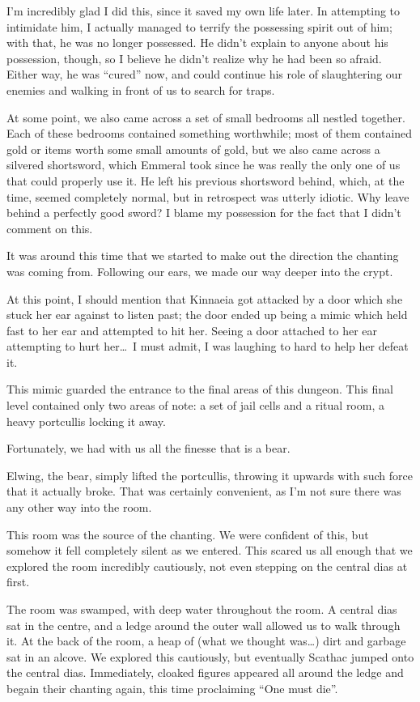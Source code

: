 I'm incredibly glad I did this, since it saved my own life later. In attempting to intimidate him, I actually managed to terrify the possessing spirit out of him; with that, he was no longer possessed. He didn't explain to anyone about his possession, though, so I believe he didn't realize why he had been so afraid. Either way, he was ``cured'' now, and could continue his role of slaughtering our enemies and walking in front of us to search for traps.

At some point, we also came across a set of small bedrooms all nestled together. Each of these bedrooms contained something worthwhile; most of them contained gold or items worth some small amounts of gold, but we also came across a silvered shortsword, which Emmeral took since he was really the only one of us that could properly use it. He left his previous shortsword behind, which, at the time, seemed completely normal, but in retrospect was utterly idiotic. Why leave behind a perfectly good sword? I blame my possession for the fact that I didn't comment on this.

It was around this time that we started to make out the direction the chanting was coming from. Following our ears, we made our way deeper into the crypt.

At this point, I should mention that Kinnaeia got attacked by a door which she stuck her ear against to listen past; the door ended up being a mimic which held fast to her ear and attempted to hit her. Seeing a door attached to her ear attempting to hurt her\dots\ I must admit, I was laughing to hard to help her defeat it.

This mimic guarded the entrance to the final areas of this dungeon. This final level contained only two areas of note: a set of jail cells and a ritual room, a heavy portcullis locking it away.

Fortunately, we had with us all the finesse that is a bear.

Elwing, the bear, simply lifted the portcullis, throwing it upwards with such force that it actually broke. That was certainly convenient, as I'm not sure there was any other way into the room.

This room was the source of the chanting. We were confident of this, but somehow it fell completely silent as we entered. This scared us all enough that we explored the room incredibly cautiously, not even stepping on the central dias at first.

The room was swamped, with deep water throughout the room. A central dias sat in the centre, and a ledge around the outer wall allowed us to walk through it. At the back of the room, a heap of (what we thought was\dots) dirt and garbage sat in an alcove. We explored this cautiously, but eventually Scathac jumped onto the central dias. Immediately, cloaked figures appeared all around the ledge and begain their chanting again, this time proclaiming ``One must die''.

